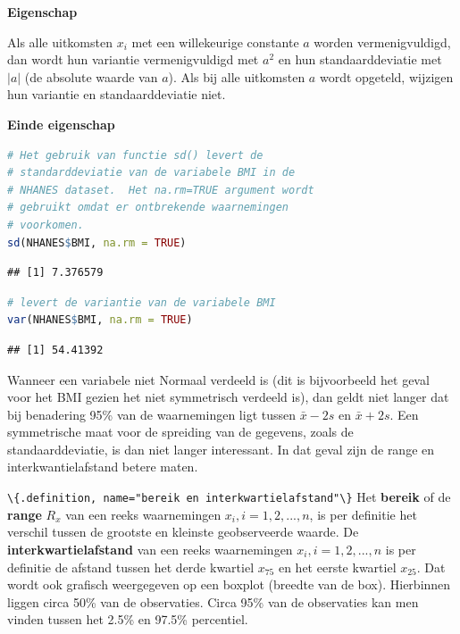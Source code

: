 \documentclass[
  12pt,dutch,coursenotes]{book}
\newcommand{\passthrough}[1]{#1}
\begin{document}
\textbf{Eigenschap}

Als alle uitkomsten \(x_i\) met een willekeurige constante \(a\)
worden vermenigvuldigd, dan wordt hun variantie vermenigvuldigd met \(a^2\) en
hun standaarddeviatie met \(|a|\) (de absolute waarde van \(a\)). Als bij alle
uitkomsten \(a\) wordt opgeteld, wijzigen hun variantie en standaarddeviatie
niet.

\textbf{Einde eigenschap}

\begin{lstlisting}[language=R]
# Het gebruik van functie sd() levert de
# standarddeviatie van de variabele BMI in de
# NHANES dataset.  Het na.rm=TRUE argument wordt
# gebruikt omdat er ontbrekende waarnemingen
# voorkomen.
sd(NHANES$BMI, na.rm = TRUE)
\end{lstlisting}

\begin{lstlisting}
## [1] 7.376579
\end{lstlisting}

\begin{lstlisting}[language=R]
# levert de variantie van de variabele BMI
var(NHANES$BMI, na.rm = TRUE)
\end{lstlisting}

\begin{lstlisting}
## [1] 54.41392
\end{lstlisting}

Wanneer een variabele niet Normaal verdeeld is (dit is bijvoorbeeld het
geval voor het BMI gezien het niet symmetrisch verdeeld is), dan
geldt niet langer dat bij benadering 95\% van de waarnemingen ligt tussen \(\bar{x} - 2 s\) en \(\bar{x} + 2 s\). Een symmetrische maat voor de spreiding
van de gegevens, zoals de standaarddeviatie, is dan niet langer interessant.
In dat geval zijn de range en interkwantielafstand betere maten.

\passthrough{\lstinline!\{.definition, name="bereik en interkwartielafstand"\}!}
Het \textbf{bereik} of de \textbf{range} \(R_x\) van een reeks waarnemingen \(x_i, i=1,2,...,n\), is per definitie het verschil tussen de grootste en
kleinste geobserveerde waarde. De \textbf{interkwartielafstand} van een
reeks waarnemingen \(x_i, i=1,2,...,n\) is per definitie de afstand tussen het derde kwartiel \(x_{75}\) en het eerste kwartiel \(x_{25}\). Dat wordt ook grafisch weergegeven op een boxplot (breedte van de box). Hierbinnen liggen circa 50\% van de observaties. Circa 95\% van de observaties kan men vinden tussen het 2.5\% en 97.5\% percentiel.
\end{document}
